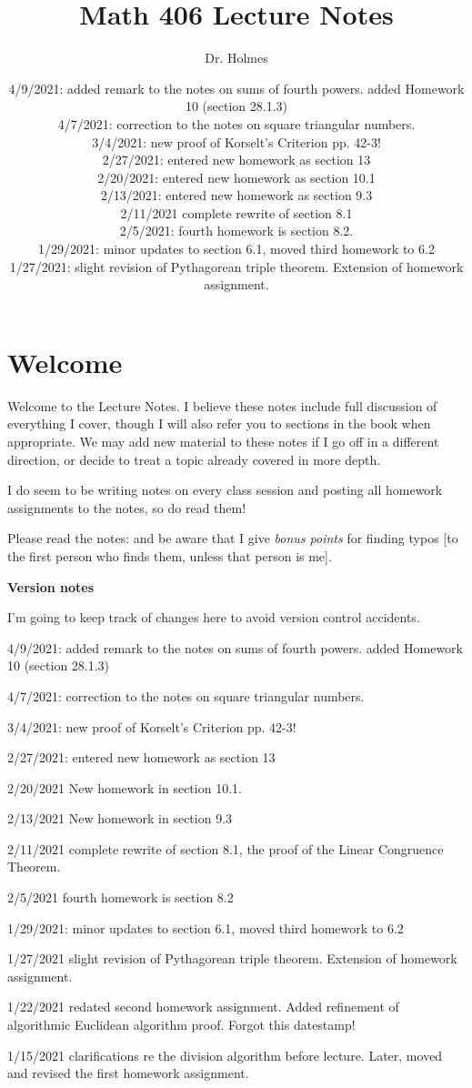 \documentclass[12pt]{article}
\title{Math 406 Lecture Notes}
\author{Dr. Holmes}
\date{4/9/2021:  added remark to the notes on sums of fourth powers. added Homework 10 (section 28.1.3)\\
4/7/2021:  correction to the notes on square triangular numbers.\\
3/4/2021:  new proof of Korselt's Criterion pp. 42-3!\\
2/27/2021:  entered new homework as section 13\\
2/20/2021:  entered new homework as section 10.1\\
2/13/2021:  entered new homework as section 9.3\\
2/11/2021 complete rewrite of section 8.1\\2/5/2021:  fourth homework is section 8.2.\\
1/29/2021:  minor updates to section 6.1, moved third homework to 6.2\\
1/27/2021:  slight revision of Pythagorean triple theorem.  Extension of homework assignment.\\
}
\begin{document}
\maketitle

\section{Welcome}

Welcome to the Lecture Notes.  I believe these notes include full discussion of everything I cover, though I will also refer you to sections in the book when appropriate.  We may add new material to these notes if I go off in a different direction, or decide to treat a topic already covered in more depth.

I do seem to be writing notes on every class session and posting all homework assignments to the notes, so do read them!

Please read the notes:  and be aware that I give {\em bonus points} for finding typos [to the first person who finds them, unless that person is me].

{\bf Version notes}

I'm going to keep track of changes here to avoid version control accidents.

4/9/2021:  added remark to the notes on sums of fourth powers. added Homework 10 (section 28.1.3)

4/7/2021:  correction to the notes on square triangular numbers.

3/4/2021:  new proof of Korselt's Criterion pp. 42-3!

2/27/2021:  entered new homework as section 13

2/20/2021  New homework in section 10.1.

2/13/2021  New homework in section 9.3

2/11/2021 complete rewrite of section 8.1, the proof of the Linear Congruence Theorem.

2/5/2021 fourth homework is section 8.2

1/29/2021:  minor updates to section 6.1, moved third homework to 6.2

1/27/2021   slight revision of Pythagorean triple theorem.  Extension of homework assignment.

1/22/2021  redated second homework assignment.  Added refinement of algorithmic Euclidean algorithm proof.  Forgot this datestamp!

1/15/2021 clarifications re the division algorithm before lecture.  Later, moved and revised the first homework assignment.
\end{document}
